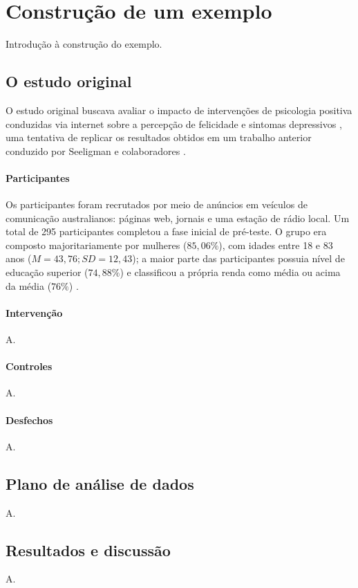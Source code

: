 \section{Construção de um exemplo}

Introdução à construção do exemplo.

\subsection{O estudo original}

O estudo original buscava avaliar o impacto de intervenções de psicologia positiva conduzidas via internet sobre a percepção de felicidade e
sintomas depressivos \cite{Woodworth2017}, uma tentativa de replicar os resultados obtidos em um trabalho anterior conduzido por Seeligman e
colaboradores \cite{Seeligman2005}.

\paragraph{Participantes}

Os participantes foram recrutados por meio de anúncios em veículos de comunicação australianos: páginas web, jornais e uma estação de rádio
local. Um total de 295 participantes completou a fase inicial de pré-teste. O grupo era composto majoritariamente por mulheres ($85,06\%$),
com idades entre 18 e 83 anos ($M=43,76; SD=12,43$); a maior parte das participantes possuia nível de educação superior ($74,88\%$) e classificou
a própria renda como média ou acima da média ($76\%$) \cite{Woodworth2017, Collins2023}.

\paragraph{Intervenção}

A.

\paragraph{Controles}

A.

\paragraph{Desfechos}

A.

\subsection{Plano de análise de dados}

A.

\subsection{Resultados e discussão}

A.
